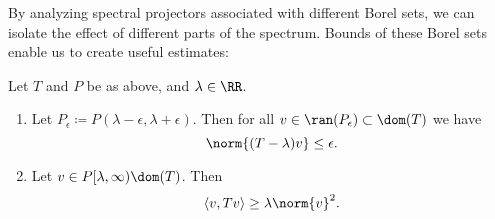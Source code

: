 \documentclass[oneside,reqno,letterpaper]{amsart}
\newcommand{\stronglim}{\text{s-lim}}
\begin{document}
By analyzing spectral projectors associated with different Borel sets, we can isolate the effect of different parts of the spectrum. 
Bounds of these Borel sets enable us to create useful estimates: 

\begin{proposition}
\label{thm:SP2}
  Let \(T\) and \(P\) be as above, and \(\lambda \in \RR\). 
  \begin{enumerate}[label=(\alph*)]
    \item\label{enum:SP-prop:1} 
      Let \(P_{\epsilon} \coloneqq P(\lambda - \epsilon, \lambda + \epsilon)\). 
      Then for all \(v \in \ran(P_{\epsilon}) \subset \dom(T)\) we have 
      \[
        \norm{(T - \lambda) v} \leq \epsilon . 
      \] 
    \item\label{enum:SP-prop:2} 
      Let \(v \in P[\lambda, \infty) \dom(T)\).
      Then 
      \[
        \left< v, Tv \right> \geq \lambda \norm{v}^2 . 
      \] 
  \end{enumerate}
\end{proposition}
\end{document}
